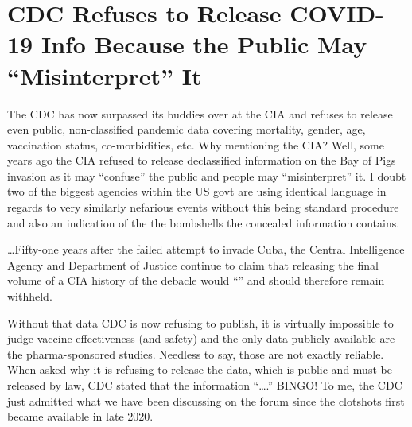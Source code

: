 \chapter{CDC Refuses to Release COVID-19 Info Because the Public May \enquote{Misinterpret} It}

\begin{refsection}

The CDC has now surpassed its buddies over at the CIA and refuses to release even public, non-classified pandemic data covering mortality, gender, age, vaccination status, co-morbidities, etc. Why mentioning the CIA? Well, some years ago the CIA refused to release declassified information on the Bay of Pigs invasion as it may \enquote{confuse} the public and people may \enquote{misinterpret} it. I doubt two of the biggest agencies within the US govt are using identical language in regards to very similarly nefarious events without this being standard procedure and also an indication of the the bombshells the concealed information contains.

\begin{tcolorbox}[quote]

\dots{}Fifty-one years after the failed attempt to invade Cuba, the Central Intelligence Agency and Department of Justice continue to claim that releasing the final volume of a CIA history of the debacle would \enquote{} and should therefore remain withheld.\textsuperscript{\cite{url912bksd9}}

\end{tcolorbox}

Without that data CDC is now refusing to publish, it is virtually impossible to judge vaccine effectiveness (and safety) and the only data publicly available are the pharma-sponsored studies. Needless to say, those are not exactly reliable. When asked why it is refusing to release the data, which is public and must be released by law, CDC stated that the information \enquote{\dots{}.} BINGO! To me, the CDC just admitted what we have been discussing on the forum since the clotshots first became available in late 2020.


\end{refsection}
